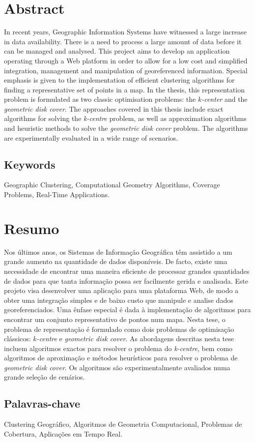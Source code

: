 \setcounter{page}{0}
\vspace*{0.1cm}
\section*{\huge Abstract}

In recent years, Geographic Information Systems have witnessed a large increase in data availability. There is a need to process a large amount of data before it can be managed and analysed. This project aims to develop an application operating through a Web platform in order to allow for a low cost and simplified integration, management and manipulation of georeferenced information. Special emphasis is given to the implementation of efficient clustering algorithms for finding a representative set of points in a map. In the thesis, this representation problem is formulated as two classic optimisation problems: the \emph{$k$-center} and the \emph{geometric disk cover}. The approaches covered in this thesis include exact algorithms for solving the \emph{k-centre} problem, as well as approximation algorithms and heuristic methods to solve the \emph{geometric disk cover} problem. The algorithms are experimentally evaluated in a wide range of scenarios.

\subsection*{\large Keywords}

Geographic Clustering, Computational Geometry Algorithms, Coverage Problems, Real-Time Applications.

\vspace*{0.6cm}

\section*{\huge Resumo}

Nos últimos anos, os Sistemas de Informação Geográfica têm assistido a um grande aumento na quantidade de dados disponíveis. De facto, existe uma necessidade de encontrar uma maneira eficiente de processar grandes quantidades de dados para que tanta informação possa ser facilmente gerida e analisada. Este projeto visa desenvolver uma aplicação para uma plataforma Web, de modo a obter uma integração simples e de baixo custo que manipule e analise dados georeferenciados. Uma ênfase especial é dada à implementação de algoritmos para encontrar um conjunto representativo de pontos num mapa. Nesta tese, o problema de representação é formulado como dois problemas de optimisação clássicos: \emph{$k$-centre} e \emph{geometric disk cover}. As abordagens descritas nesta tese incluem algoritmos exactos para resolver o problema do \emph{k-centre}, bem como algoritmos de aproximação e métodos heurísticos para resolver o problema de \emph{geometric disk cover}. Os algoritmos são experimentalmente avaliados numa grande seleção de cenários.

\subsection*{Palavras-chave}

Clustering Geográfico, Algoritmos de Geometria Computacional, Problemas de Cobertura, Aplicações em Tempo Real.

\vfill